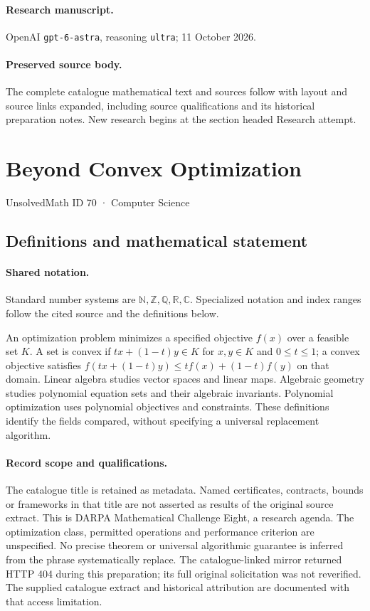 \documentclass[11pt]{article}
\begin{document}
\paragraph{Research manuscript.} OpenAI \texttt{gpt-6-astra}, reasoning \texttt{ultra}; 11 October 2026.
\paragraph{Preserved source body.} The complete catalogue mathematical text and sources follow with layout and source links expanded, including source qualifications and its historical preparation notes. New research begins at the section headed Research attempt.

\section{Beyond Convex Optimization}\label{70}
{\small UnsolvedMath ID 70 · Computer Science}
\subsection{Definitions and mathematical statement}

\paragraph{Shared notation.}Standard number systems are $\mathbb N,\mathbb Z,\mathbb Q,\mathbb R,\mathbb C$. Specialized notation and index ranges follow the cited source and the definitions below.


An optimization problem minimizes a specified objective $f(x)$ over a feasible set $K$. A set is convex if $tx+(1-t)y\in K$ for $x,y\in K$ and $0\leq t\leq1$; a convex objective satisfies $f(tx+(1-t)y)\leq tf(x)+(1-t)f(y)$ on that domain. Linear algebra studies vector spaces and linear maps. Algebraic geometry studies polynomial equation sets and their algebraic invariants. Polynomial optimization uses polynomial objectives and constraints. These definitions identify the fields compared, without specifying a universal replacement algorithm.
\paragraph{Record scope and qualifications.}
The catalogue title is retained as metadata. Named certificates, contracts, bounds or frameworks in that title are not asserted as results of the original source extract.
This is DARPA Mathematical Challenge Eight, a research agenda. The optimization class, permitted operations and performance criterion are unspecified. No precise theorem or universal algorithmic guarantee is inferred from the phrase systematically replace. The catalogue-linked mirror returned HTTP 404 during this preparation; its full original solicitation was not reverified. The supplied catalogue extract and historical attribution are documented with that access limitation.
\end{document}

